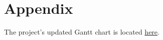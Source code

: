 \documentclass[12pt, titlepage]{article}
\begin{document}
\newpage

\section{Appendix}

The project's updated Gantt chart is located \href{https://gitlab.cas.mcmaster.ca/webapp/webapp_l02_grp15/-/tree/main/ProjectSchedule}{here}.
\end{document}
